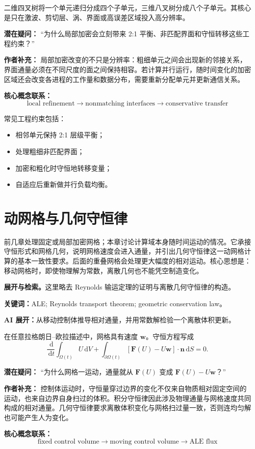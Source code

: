 \documentclass[11pt,openany]{ctexbook}
\newcommand{\dd}{\,\mathrm d}
\newcommand{\studyroute}[3]{%
  \par\smallskip\noindent\textbf{展开与检索。}#1\par
  \noindent\textbf{关键词：}#2。\par
  \noindent\textbf{AI 展开：}#3\par
}
\begin{document}
二维四叉树将一个单元递归分成四个子单元，三维八叉树分成八个子单元。其核心是只在激波、剪切层、涡、界面或高误差区域投入高分辨率。

\begin{authornote}
\textbf{潜在疑问：}
“为什么局部加密会立刻带来 2:1 平衡、非匹配界面和守恒转移这些工程约束？”

\textbf{作者补充：}
局部加密改变的不只是分辨率：粗细单元之间会出现新的邻接关系，界面通量必须在不同尺度的面之间保持相容。若计算并行运行，随时间变化的加密区域还会改变各进程的工作量和数据分布，需要重新分配单元并更新通信关系。

\textbf{核心概念联系：}
\[
\text{local refinement}
\longrightarrow
\text{nonmatching interfaces}
\longrightarrow
\text{conservative transfer}
\]
\end{authornote}

常见工程约束包括：
\begin{itemize}
  \item 相邻单元保持 2:1 层级平衡；
  \item 处理粗细非匹配界面；
  \item 加密和粗化时守恒地转移变量；
  \item 自适应后重新做并行负载均衡。
\end{itemize}

\chapter{动网格与几何守恒律}

\begin{chaptersummary}
前几章处理固定或局部加密网格；本章讨论计算域本身随时间运动的情况。它承接守恒形式和网格几何，说明网格速度会进入通量，并引出几何守恒律这一动网格计算的基本一致性要求。后面的重叠网格会处理更大幅度的相对运动。核心思想是：移动网格时，即使物理解为常数，离散几何也不能凭空制造变化。
\end{chaptersummary}
\studyroute{这里略去 Reynolds 输运定理的证明与离散几何守恒律的构造。}{ALE; Reynolds transport theorem; geometric conservation law}{从移动控制体推导相对通量，并用常数解检验一个离散体积更新。}

在任意拉格朗日--欧拉描述中，网格具有速度 \(\bm w\)。守恒方程写成
\[
\frac{\dd}{\dd t}\int_{\Omega(t)}U\dd V
+
\int_{\partial\Omega(t)}
[\bm F(U)-U\bm w]\cdot\bm n\dd S
=0.
\]

\begin{authornote}
\textbf{潜在疑问：}
“为什么网格一运动，通量就从 \(\bm F(U)\) 变成 \(\bm F(U)-U\bm w\)？”

\textbf{作者补充：}
控制体运动时，守恒量穿过边界的变化不仅来自物质相对固定空间的运动，也来自边界自身扫过的体积。积分守恒律因此涉及物理通量与网格速度共同构成的相对通量。几何守恒律要求离散体积变化与网格扫过量一致，否则连均匀解也可能产生人为变化。

\textbf{核心概念联系：}
\[
\text{fixed control volume}
\longrightarrow
\text{moving control volume}
\longrightarrow
\text{ALE flux}
\]
\end{authornote}
\end{document}
